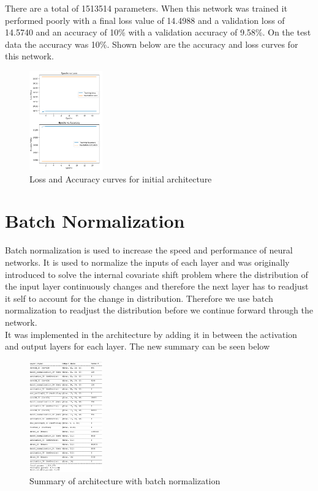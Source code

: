\documentclass[conference]{IEEEtran}
\begin{document}
    There are a total of 1513514 parameters. When this network was trained it performed
    poorly with a final loss value of 14.4988 and a validation loss of 14.5740 and an
    accuracy of 10\% with a validation accuracy of 9.58\%. On the test data
    the accuracy was 10\%. Shown below are the accuracy and loss curves for this network.

    \begin{figure}[H]
        \centering
        \captionsetup{justification=centering}
        \centering
            \includegraphics[width=0.28\textwidth]{3.png}
            \caption{Loss and Accuracy curves for initial architecture}
    \end{figure}

    \section{Batch Normalization}

    Batch normalization is used to increase the speed and performance of neural networks.
    It is used to normalize the inputs of each layer and was originally introduced to solve
    the internal covariate shift problem where the distribution of the input layer continuously
    changes and therefore the next layer has to readjust it self to account for the change in distribution.
    Therefore we use batch normalization to readjust the distribution before we continue forward
    through the network.\\

    It was implemented in the architecture by adding it in between the activation and output layers for
    each layer. The new summary can be seen below

    \begin{figure}[H]
        \centering
        \captionsetup{justification=centering}
        \centering
            \includegraphics[width=0.28\textwidth]{4.png}
            \caption{Summary of architecture with batch normalization}
    \end{figure}
\end{document}
